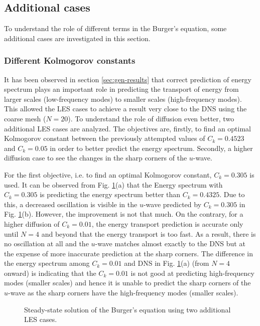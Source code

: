 \documentclass[a4paper]{article}
\begin{document}
\subsection{Additional cases}
To understand the role of different terms in the Burger's equation, some additional cases are investigated in this section.

\subsubsection{Different Kolmogorov constants}
It has been observed in section \ref{sec:gen-results} that correct prediction of energy spectrum plays an important role in predicting the transport of energy from larger scales (low-frequency modes) to smaller scales (high-frequency modes). This allowed the LES cases to achieve a result very close to the DNS using the coarse mesh ($ N=20 $). To understand the role of diffusion even better, two additional LES cases are analyzed. The objectives are, firstly, to find an optimal Kolmogorov constant between the previously attempted values of $ C_k = 0.4523 $ and $ C_k = 0.05 $ in order to better predict the energy spectrum. Secondly, a higher diffusion case to see the changes in the sharp corners of the $ u $-wave.

For the first objective, i.e. to find an optimal Kolmogorov constant, $ C_k = 0.305 $ is used. It can be observed from Fig. \ref{fig:Diff_Kolmogorov}(a) that the Energy spectrum with $ C_k = 0.305 $ is predicting the energy spectrum better than $ C_k = 0.4325 $. Due to this, a decreased oscillation is visible in the $ u $-wave predicted by $ C_k = 0.305 $ in Fig. \ref{fig:Diff_Kolmogorov}(b). However, the improvement is not that much. On the contrary, for a higher diffusion of $ C_k = 0.01 $, the energy transport prediction is accurate only until $ N=4 $ and beyond that the energy transport is too fast. As a result, there is no oscillation at all and the $ u $-wave matches almost exactly to the DNS but at the expense of more inaccurate prediction at the sharp corners. The difference in the energy spectrum among $ C_k = 0.01 $ and DNS in Fig. \ref{fig:Diff_Kolmogorov}(a) (from $ N=4 $ onward) is indicating that the $ C_k = 0.01 $ is not good at predicting high-frequency modes (smaller scales) and hence it is unable to predict the sharp corners of the $ u $-wave as the sharp corners have the high-frequency modes (smaller scales).

\begin{figure}[H]
	\centering
	\begin{minipage}[b]{0.52\textwidth}
	\end{minipage}%
	\begin{minipage}[b]{0.52\textwidth}
	\end{minipage}
	\caption{Steady-state solution of the Burger's equation using two additional LES cases.}
	\label{fig:Diff_Kolmogorov}
\end{figure}
\end{document}
